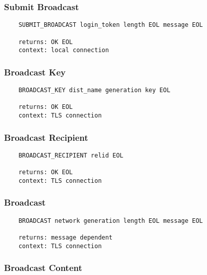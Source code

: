 \documentclass[letterpaper,11pt,oneside]{article}
\begin{document}
\subsubsection{Submit Broadcast}

\vspace{10pt}
\begin{verbatim}
    SUBMIT_BROADCAST login_token length EOL message EOL

    returns: OK EOL
    context: local connection
\end{verbatim}
\vspace{10pt}

\subsubsection{Broadcast Key}

\vspace{10pt}
\begin{verbatim}
    BROADCAST_KEY dist_name generation key EOL

    returns: OK EOL
    context: TLS connection
\end{verbatim}
\vspace{10pt}

\subsubsection{Broadcast Recipient}

\vspace{10pt}
\begin{verbatim}
    BROADCAST_RECIPIENT relid EOL

    returns: OK EOL
    context: TLS connection
\end{verbatim}
\vspace{10pt}

\subsubsection{Broadcast}

\vspace{10pt}
\begin{verbatim}
    BROADCAST network generation length EOL message EOL

    returns: message dependent
    context: TLS connection
\end{verbatim}
\vspace{10pt}

\subsubsection{Broadcast Content}
\end{document}

